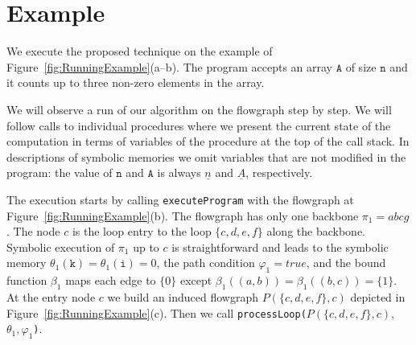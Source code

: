 \documentclass[10pt,a4paper]{article}
\newcommand{\var}[1]{\texttt{#1}}
\newcommand{\sym}[1]{\ensuremath{\underline{#1}}}
\newcommand{\true}{\ensuremath{\mathit{true}}}
\begin{document}
\section{Example}\label{sec:example}





We execute the proposed technique on the example of
Figure~\ref{fig:RunningExample}(a--b). The program accepts an array
$\var{A}$ of size $\var{n}$ and it counts up to three non-zero
elements in the array.

We will observe a run of our algorithm on the flowgraph step by step. We
will follow calls to individual procedures where we present the current
state of the computation in terms of variables of the procedure at the top
of the call stack. In descriptions of symbolic memories we omit variables
that are not modified in the program: the value of $\var{n}$ and $\var{A}$
is always $\sym{n}$ and $\sym{A}$, respectively.

The execution starts by calling \texttt{executeProgram} with the flowgraph at
Figure~\ref{fig:RunningExample}(b). The flowgraph has only one backbone
$\pi_1=\mathit{abcg}$. The node $c$ is the loop entry to the loop
$\{c,d,e,f\}$ along the backbone. Symbolic execution of $\pi_1$ up to $c$
is straightforward and leads to the symbolic memory
$\theta_1(\var{k})=\theta_1(\var{i})=0$, the
path condition $\varphi_1=\true$, and the bound function $\beta_1$ maps each
edge to $\{0\}$ except $\beta_1((a,b))=\beta_1((b,c))=\{1\}$. At the entry node
$ c $ we build an induced flowgraph $ P(\{c,d,e,f\},c) $ depicted in
Figure~\ref{fig:RunningExample}(c). Then we call \texttt{processLoop(}$P(\{c,d,e,f\},c),$ $\theta_1,\varphi_1$\texttt{)}.
\end{document}
